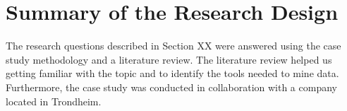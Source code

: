 \section{Summary of the Research Design}
The research questions described in Section XX were answered using the case study methodology and a literature review. The literature review helped us getting familiar with the topic and to identify the tools needed to mine data. Furthermore, the case study was conducted in collaboration with a company located in Trondheim. 


























